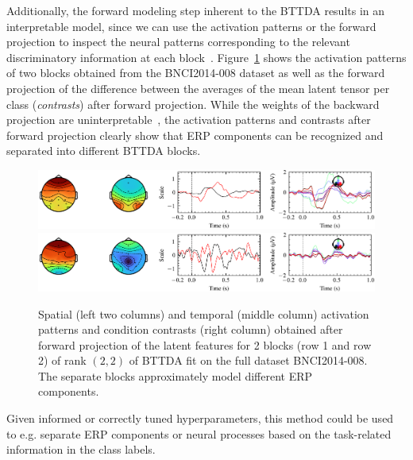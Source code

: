 \documentclass[twocolumn]{article}
\begin{document}
Additionally, the forward modeling step inherent to the \textsc{BTTDA} results
in an interpretable model, since we can use the activation patterns or the
forward projection to inspect the neural patterns corresponding to the
relevant discriminatory information at each block~\cite{Haufe2014}.
Figure~\ref{fig:forward} shows the activation patterns
of two blocks obtained from the BNCI2014-008 dataset as well as the forward
projection of the difference between the averages of the mean latent tensor per
class (\emph{contrasts}) after forward projection.
While the weights of the backward projection are
uninterpretable~\cite{Haufe2014},
the activation patterns and contrasts after forward projection clearly show
that ERP components can be recognized and separated into different
\textsc{BTTDA} blocks.
\begin{figure}[t]
	\includegraphics[width=\linewidth]{figures/forward_block-0.png}
	\includegraphics[width=\linewidth]{figures/forward_block-1.png}
	\caption{Spatial (left two columns) and temporal (middle column) activation patterns and
		condition contrasts (right column) obtained after forward projection of the latent
		features for 2 blocks (row 1 and row 2) of rank $(2,2)$ of \textsc{BTTDA}
		fit on the full dataset BNCI2014-008.
		The separate blocks approximately model different ERP
		components.}
	\label{fig:forward}
\end{figure}
Given informed or correctly tuned hyperparameters, this method could be used to
e.g. separate ERP components or neural processes based on the task-related
information in the class labels.
\end{document}
